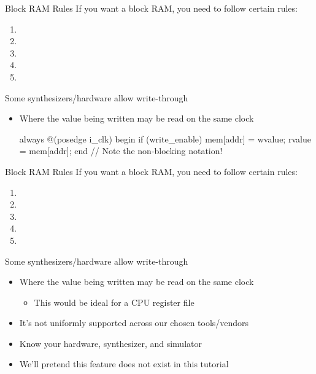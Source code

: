 \documentclass[style=gt,mode=present,paper=screen]{powerdot}
\begin{document}
\begin{slide}[bm=,toc=,method=direct]{Block RAM Rules}
If you want a block RAM, you need to follow certain rules:
\begin{enumerate}
\item {}
\item {}
\item {}
\item {}
\item {}
\end{enumerate}
Some synthesizers/hardware allow write-through
\begin{itemize}
\item Where the value being written may be read on the same clock
\begin{zformal}
always @(posedge i_clk)
begin
	if (write_enable)
		mem[addr] = wvalue;
	rvalue = mem[addr];
end // Note the non-blocking notation!
\end{zformal}
\end{itemize}
\end{slide}
%
%
\begin{slide}[bm=,toc=,method=direct]{Block RAM Rules}
If you want a block RAM, you need to follow certain rules:
\begin{enumerate}
\item {}
\item {}
\item {}
\item {}
\item {}
\end{enumerate}
Some synthesizers/hardware allow write-through
\begin{itemize}
\item Where the value being written may be read on the same clock
	\begin{itemize}
	\item This would be ideal for a CPU register file
	\end{itemize}
\item It's not uniformly supported across our chosen tools/vendors
\item Know your hardware, synthesizer, and simulator
\item We'll pretend this feature does not exist in this tutorial
\end{itemize}
\end{slide}
%
%
\end{document}
